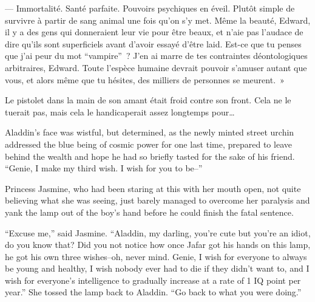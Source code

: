 --- Immortalité.
Santé parfaite.
Pouvoirs psychiques en éveil.
Plutôt simple de survivre à partir de sang animal une fois qu'on s'y met.
Même la beauté, Edward, il y a des gens qui donneraient leur vie pour être beaux, et n'aie pas l'audace de dire qu'ils sont superficiels avant d'avoir essayé d'être laid.
Est-ce que tu penses que j'ai peur du mot “vampire”~?
J'en ai marre de tes contraintes déontologiques arbitraires, Edward.
Toute l'espèce humaine devrait pouvoir s'amuser autant que vous, et alors même que tu hésites, des milliers de personnes se meurent.~»

Le pistolet dans la main de son amant était froid contre son front.
Cela ne le tuerait pas, mais cela le handicaperait assez longtemps pour…


Aladdin’s face was wistful, but determined, as the newly minted street urchin addressed the blue being of cosmic power for one last time, prepared to leave behind the wealth and hope he had so briefly tasted for the sake of his friend.
“Genie, I make my third wish.
I wish for you to be--”

Princess Jasmine, who had been staring at this with her mouth open, not quite believing what she was seeing, just barely managed to overcome her paralysis and yank the lamp out of the boy’s hand before he could finish the fatal sentence.

“Excuse me,” said Jasmine.
“Aladdin, my darling, you’re cute but you’re an idiot, do you know that?
Did you not notice how once Jafar got his hands on this lamp, he got his own three wishes--oh, never mind.
Genie, I wish for everyone to always be young and healthy, I wish nobody ever had to die if they didn’t want to, and I wish for everyone’s intelligence to gradually increase at a rate of 1 IQ point per year.” She tossed the lamp back to Aladdin.
“Go back to what you were doing.”

%
%

